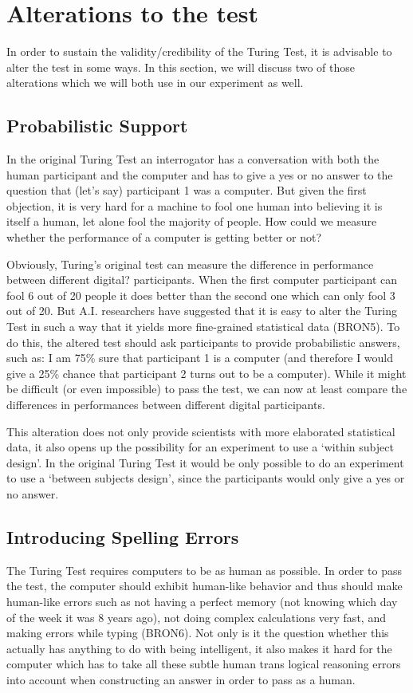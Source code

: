 \section{Alterations to the test}
In order to sustain the validity/credibility of the Turing Test, it is advisable to alter the test in some ways. In this section, we will discuss two of those alterations which we will both use in our experiment as well.


\subsection{Probabilistic Support}
In the original Turing Test an interrogator has a conversation with both the human participant and the computer and has to give a yes or no answer to the question that (let’s say) participant 1 was a computer. But given the first objection, it is very hard for a machine to fool one human into believing it is itself a human, let alone fool the majority of people. How could we measure whether the performance of a computer is getting better or not?

Obviously, Turing’s original test can measure the difference in performance between different digital? participants. When the first computer participant can fool 6 out of 20 people it does better than the second one which can only fool 3 out of 20. But A.I. researchers have suggested that it is easy to alter the Turing Test in such a way that it yields more fine-grained statistical data (BRON5). To do this, the altered test should ask participants to provide probabilistic answers, such as: I am 75\% sure that participant 1 is a computer (and therefore I would give a 25\% chance that participant 2 turns out to be a computer). While it might be difficult (or even impossible) to pass the test, we can now at least compare the differences in performances between different digital participants.

This alteration does not only provide scientists with more elaborated statistical data, it also opens up the possibility for an experiment to use a ‘within subject design’. In the original Turing Test it would be only possible to do an experiment to use a ‘between subjects design’, since the participants would only give a yes or no answer.


\subsection{Introducing Spelling Errors}
The Turing Test requires computers to be as human as possible. In order to pass the test, the computer should exhibit human-like behavior and thus should make human-like errors such as not having a perfect memory (not knowing which day of the week it was 8 years ago), not doing complex calculations very fast, and making errors while typing (BRON6). Not only is it the question whether this actually has anything to do with being intelligent, it also makes it hard for the computer which has to take all these subtle human trans logical reasoning errors into account when constructing an answer in order to pass as a human.

